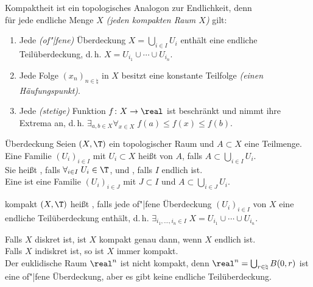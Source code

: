 \begin{Bem}
    Kompaktheit ist ein topologisches Analogon zur Endlichkeit, denn \\
    für jede endliche Menge $X$ \emph{(jeden kompakten Raum $X$)} gilt:
    \begin{enumerate}
        \item
        Jede \emph{(of"|fene)} Überdeckung $X = \bigcup_{i \in I} U_i$ enthält
        eine endliche Teilüberdeckung, d.\,h.
        $X = U_{i_1} \cup \dotsb \cup U_{i_n}$.

        \item
        Jede Folge $(x_n)_{n \in \natural}$ in $X$ besitzt eine konstante
        Teilfolge \emph{(einen Häufungspunkt)}.

        \item
        Jede \emph{(stetige)} Funktion $f\colon X \rightarrow \real$ ist
        beschränkt und nimmt ihre Extrema an, d.\,h.
        $\exists_{a, b \in X} \forall_{x \in X}\; f(a) \le f(x) \le f(b)$.
    \end{enumerate}
\end{Bem}

\linie

\begin{Def}{Überdeckung}
    Seien $(X, \T)$ ein topologischer Raum und $A \subset X$ eine Teilmenge. \\
    Eine Familie $(U_i)_{i \in I}$ mit $U_i \subset X$ heißt
     von $A$, falls $A \subset \bigcup_{i \in I} U_i$. \\
    Sie heißt , falls $\forall_{i \in I}\; U_i \in \T$,
    und , falls $I$ endlich ist. \\
    Eine  ist eine Familie $(U_i)_{i \in J}$ mit
    $J \subset I$ und $A \subset \bigcup_{i \in J} U_i$.
\end{Def}

\begin{Def}{kompakt}
    $(X, \T)$ heißt , falls jede of"|fene Überdeckung
    $(U_i)_{i \in I}$ von $X$ eine endliche Teilüberdeckung enthält, d.\,h.
    $\exists_{i_1, \dotsc, i_n \in I}\; X = U_{i_1} \cup \dotsb \cup U_{i_n}$.
\end{Def}

\begin{Bsp}
    Falls $X$ diskret ist, ist $X$ kompakt genau dann, wenn $X$ endlich ist. \\
    Falls $X$ indiskret ist, so ist $X$ immer kompakt. \\
    Der euklidische Raum $\real^n$ ist nicht kompakt, denn
    $\real^n = \bigcup_{r \in \natural} B(0, r)$ ist eine of"|fene Überdeckung,
    aber es gibt keine endliche Teilüberdeckung.
\end{Bsp}

